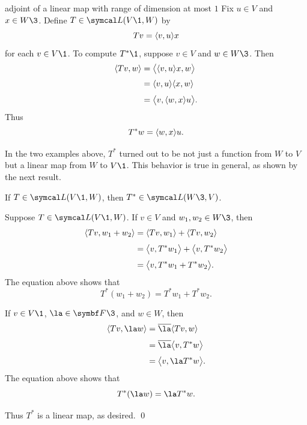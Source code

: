 \pagebreak[3]

\begin{example}[Tstar]{adjoint of a linear map with range of dimension at most\/ $1$}
Fix $u \in V$ and $x \in W\3$. Define $T \in \L(V\1, W)$ by
\[
Tv = \ip{v, u}x
\]
for each $v \in V\1$.
To compute $T^*\1$, suppose $v \in V$ and $w \in W\3$. Then
\begin{align*}
\ip{Tv, w} &= \bigl\langle \ip{v, u}x, w \bigr \rangle \\[3bp]
&= \ip{v, u} \ip{x, w} \\[3bp]
&= \bigl\langle v, \ip{w, x} u \bigr\rangle.
\end{align*}
Thus
\[
T^*w = \ip{w, x} u.
\]
\exampledisplayend
\end{example}


In the two examples above, $T^*$ turned out to be not just a function from $W$ to $V$ but a linear map from $W$ to $V\1$.  This behavior is true in general, as shown by the next result.

\vspace{.22in}

{If $T \in \L(V\1,W)$, then $T^* \in \L(W\3,V)$.}

\proof
Suppose $T \in \L(V\1,W)$.
If $v \in V$ and $w_1, w_2 \in W\3$, then
\begin{align*}
\ip{Tv, w_1 + w_2} &= \ip{Tv, w_1} + \ip{Tv, w_2} \\[3bp]
&= \ip[\big]{v, T^*w_1} + \ip[\big]{v, T^*w_2} \\[3bp]
&= \ip[\big]{v, T^*w_1 + T^*w_2}.
\end{align*}
The equation above shows that
\[
T^*(w_1 + w_2) = T^*w_1 + T^*w_2.
\]

If $v \in V\1$, $\la \in \F{}\3$, and $w \in W$, then
\begin{align*}
\ip{Tv, \la w} &= \bar{\la} \ip{Tv, w} \\[3bp]
&= \bar{\la} \ip[\big]{v, T^*w} \\[3bp]
&= \ip[\big]{v, \la T^*w}.
\end{align*}
The equation above shows that
\[
T^*(\la w) = \la T^*w.
\]

Thus $T^*$ is a linear map, as desired.
\qed

